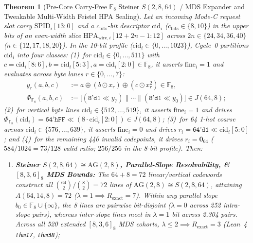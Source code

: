 \documentclass[11pt,letterpaper]{article}
\theoremstyle{spectralthm}
\newtheorem{theorem}{Theorem}[section]
\begin{document}
\begin{theorem}[Pre-Core Carry-Free $\mathbb{F}_8$ Steiner $S(2,8,64)$ / MDS Expander and Tweakable Multi-Width Feistel HPA Sealing]
\label{thm:modec}
Let an incoming Mode-C request slot carry $\mathrm{SPID}_i[13:0]$ and a $c_{\mathrm{bits}}$-bit descriptor $\mathrm{cid}_i$ ($c_{\mathrm{bits}} \in \{8,10\}$) in the upper bits of an even-width slice $\mathrm{HPA}_{\mathrm{wire},i}[12 + 2n - 1 : 12]$ across $2n \in \{24, 34, 36, 40\}$ ($n \in \{12, 17, 18, 20\}$). In the 10-bit profile ($\mathrm{cid}_i \in \{0,\ldots,1023\}$), Cycle~0 partitions $\mathrm{cid}_i$ into four classes:
(1)~for $\mathrm{cid}_i \in \{0,\ldots,511\}$ with $c = \mathrm{cid}_i[8:6], b = \mathrm{cid}_i[5:3], a = \mathrm{cid}_i[2:0] \in \mathbb{F}_8$, it asserts $\mathrm{fine}_i = 1$ and evaluates across byte lanes $r \in \{0,\ldots,7\}$:
\begin{equation}
\label{eq:f8_expander}
\begin{aligned}
y_r(a,b,c) &:= a \oplus (b \odot x_r) \oplus (c \odot x_r^2) \in \mathbb{F}_8,\\
\Phi_{\mathbb{F}_8}(a,b,c) &:= \bigl[(\texttt{8'd1} \ll y_7) \parallel \cdots \parallel (\texttt{8'd1} \ll y_0)\bigr] \in J(64,8);
\end{aligned}
\end{equation}
(2)~for vertical byte lines $\mathrm{cid}_i \in \{512,\ldots,519\}$, it asserts $\mathrm{fine}_i = 1$ and drives $\Phi_{\mathbb{F}_8}(\mathrm{cid}_i) = \texttt{64'hFF} \ll (8 \cdot \mathrm{cid}_i[2:0]) \in J(64,8)$;
(3)~for 64 1-hot coarse arenas $\mathrm{cid}_i \in \{576,\ldots,639\}$, it asserts $\mathrm{fine}_i = 0$ and drives $r_i = \texttt{64'd1} \ll \mathrm{cid}_i[5:0]$; and
(4)~for the remaining 440 invalid codepoints, it drives $r_i = \mathbf{0}_{64}$ ($584/1024 = 73/128$ valid ratio; $256/256$ in the 8-bit profile). Then:
\begin{enumerate}
  \item[(i)] \textbf{Steiner $S(2,8,64) \cong \mathrm{AG}(2,8)$, Parallel-Slope Resolvability, \& $[8,3,6]_8$ MDS Bounds:} The $64 + 8 = 72$ linear/vertical codewords construct all $\binom{64}{2}/\binom{8}{2} = 72$ lines of $\mathrm{AG}(2,8) \cong S(2,8,64)$, attaining $A(64,14,8) = 72$ ($\lambda = 1 \implies R_{\mathrm{exact}} = 7$). Within any parallel slope $b_0 \in \mathbb{F}_8 \cup \{\infty\}$, the 8 lines are pairwise bit-disjoint ($\lambda = 0$ across 252 intra-slope pairs), whereas inter-slope lines meet in $\lambda = 1$ bit across 2,304 pairs. Across all 520 extended $[8,3,6]_8$ MDS cohorts, $\lambda \le 2 \implies R_{\mathrm{exact}} = 3$ (Lean~4 \texttt{thm17}, \texttt{thm38});

\end{enumerate}
\end{theorem}
\end{document}
